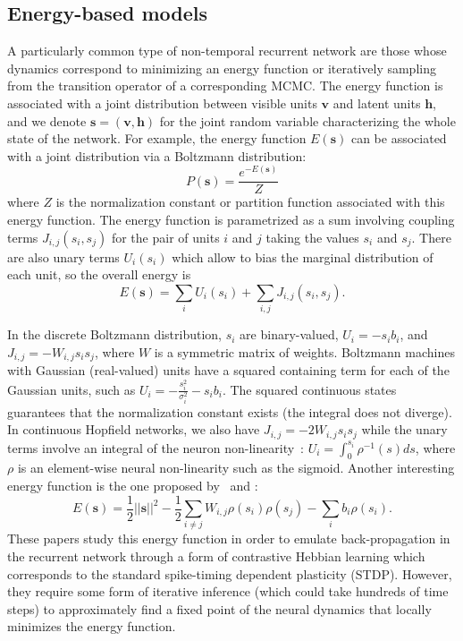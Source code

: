 \documentclass{article}
\newcommand   \vv{{\bm v}}
\newcommand   \vh{{\bm h}}
\newcommand   \vs{{\bm s}}
\begin{document}
\subsection{Energy-based models}

A particularly common type of non-temporal recurrent network are those
whose dynamics correspond to minimizing an energy function or iteratively sampling
from the transition operator of a corresponding MCMC.
The energy function is associated with a joint distribution between visible units $\vv$
and latent units $\vh$, and we denote $\vs=(\vv,\vh)$ for
the joint random variable characterizing the whole state of the network.
For example, the energy function $E(\vs)$ can be associated with a joint distribution
via a Boltzmann distribution:
\begin{equation}
  P(\vs) = \frac{e^{-E(\vs)}}{Z}
\end{equation}
where $Z$ is the normalization constant or partition function associated with this
energy function. The energy function is parametrized as a sum involving coupling terms
$J_{i,j}(s_i,s_j)$ for the pair of units $i$ and $j$ taking the values $s_i$ and $s_j$.
There are also unary terms $U_i(s_i)$ which allow to bias the marginal distribution
of each unit, so the overall energy is
\begin{equation}
  E(\vs) = \sum_i U_i(s_i) + \sum_{i,j} J_{i,j}(s_i,s_j).
\end{equation}

In the discrete Boltzmann distribution, $s_i$ are binary-valued, $U_i = -s_i b_i$,
and $J_{i,j} = - W_{i,j} s_i s_j$, where $W$ is a symmetric matrix of weights.
Boltzmann machines with Gaussian (real-valued) units have a squared containing term for
each of the Gaussian units, such as $U_i = -\frac{s_i^2}{\sigma_i^2} - s_i b_i$.
The squared continuous states guarantees that the normalization constant exists (the integral does not diverge).
In continuous Hopfield networks, we also have $J_{i,j}=- 2 W_{i,j} s_i s_j$ while
the unary terms involve an integral of the neuron non-linearity~\citep{Hopfield84}:
$U_i = \int_0^{s_i} \rho^{-1}(s) ds$, where $\rho$ is an element-wise neural non-linearity
such as the sigmoid. Another interesting energy function is the one proposed
by~\citet{Bengio-arxiv2015} and \citet{Scellier+Bengio-arxiv2016}:
\begin{equation}
  \label{eq:s+b-energy}
  E(\vs) = \frac{1}{2}||\vs||^2 - \frac{1}{2}\sum_{i\neq j} W_{i,j} \rho(s_i) \rho(s_j) - \sum_i b_i \rho(s_i).
\end{equation}
These papers study this energy function in order to emulate back-propagation
in the recurrent network through a form of contrastive Hebbian learning which
corresponds to the standard spike-timing dependent plasticity (STDP).
However, they require some form of iterative inference (which could take hundreds of
time steps) to approximately find a fixed point of
the neural dynamics that locally minimizes the energy function.
\end{document}
